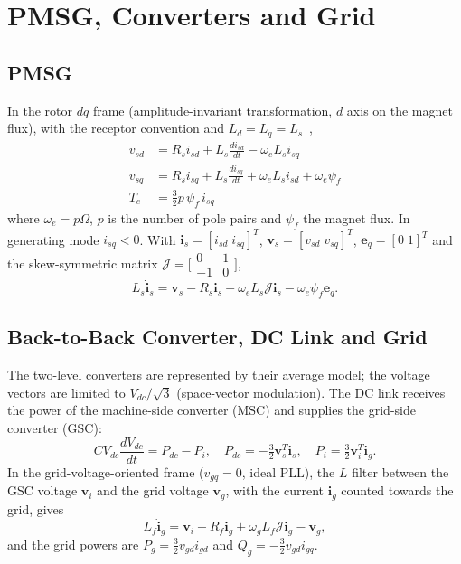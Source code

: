 \documentclass[11pt,a4paper]{article}
\newcommand{\bv}[1]{\mathbf{#1}}
\newcommand{\Jm}{\boldsymbol{\mathcal{J}}}
\begin{document}
\section{PMSG, Converters and Grid}
\subsection{PMSG}
In the rotor $dq$ frame (amplitude-invariant transformation, $d$ axis on the magnet flux), with the
receptor convention and $L_d=L_q=L_s$~\cite{wu2011},
\begin{align}
v_{sd} &= R_s i_{sd} + L_s\frac{di_{sd}}{dt} - \omega_e L_s i_{sq}\label{eq:vsd}\\
v_{sq} &= R_s i_{sq} + L_s\frac{di_{sq}}{dt} + \omega_e L_s i_{sd} + \omega_e\psi_f\label{eq:vsq}\\
T_e &= \tfrac32 p\,\psi_f\, i_{sq}\label{eq:te}
\end{align}
where $\omega_e=p\Omega$, $p$ is the number of pole pairs and $\psi_f$ the magnet flux. In generating mode
$i_{sq}<0$. With $\bv{i}_s=[i_{sd}\;i_{sq}]^T$, $\bv{v}_s=[v_{sd}\;v_{sq}]^T$, $\bv{e}_q=[0\;1]^T$ and
the skew-symmetric matrix $\Jm=\bigl[\begin{smallmatrix}0&1\\-1&0\end{smallmatrix}\bigr]$,
\begin{equation}
L_s\dot{\bv{i}}_s = \bv{v}_s - R_s\bv{i}_s + \omega_eL_s\Jm\bv{i}_s - \omega_e\psi_f\bv{e}_q .
\label{eq:pmsg}
\end{equation}

\subsection{Back-to-Back Converter, DC Link and Grid}
The two-level converters are represented by their average model; the voltage vectors are limited to
$V_{dc}/\sqrt3$ (space-vector modulation). The DC link receives the power of the machine-side converter
(MSC) and supplies the grid-side converter (GSC):
\begin{equation}
CV_{dc}\frac{dV_{dc}}{dt} = P_{dc} - P_i,\quad P_{dc}=-\tfrac32\bv{v}_s^T\bv{i}_s,\quad
P_i=\tfrac32\bv{v}_i^T\bv{i}_g .
\label{eq:dc}
\end{equation}
In the grid-voltage-oriented frame ($v_{gq}=0$, ideal PLL), the $L$ filter between the GSC voltage
$\bv{v}_i$ and the grid voltage $\bv{v}_g$, with the current $\bv{i}_g$ counted towards the grid, gives
\begin{equation}
L_f\dot{\bv{i}}_g = \bv{v}_i - R_f\bv{i}_g + \omega_gL_f\Jm\bv{i}_g - \bv{v}_g ,
\label{eq:filter}
\end{equation}
and the grid powers are $P_g=\frac32v_{gd}i_{gd}$ and $Q_g=-\frac32v_{gd}i_{gq}$.
\end{document}
